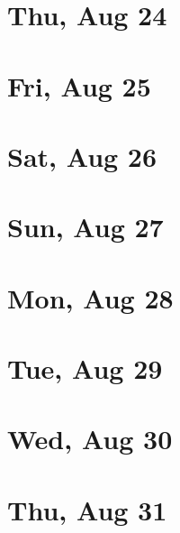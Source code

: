 	\section{Thu, Aug 24}
		
	\section{Fri, Aug 25}
		
	\section{Sat, Aug 26}
		
	\section{Sun, Aug 27}
		
	\section{Mon, Aug 28}
		
	\section{Tue, Aug 29}
		
	\section{Wed, Aug 30}
		
	\section{Thu, Aug 31}
		
